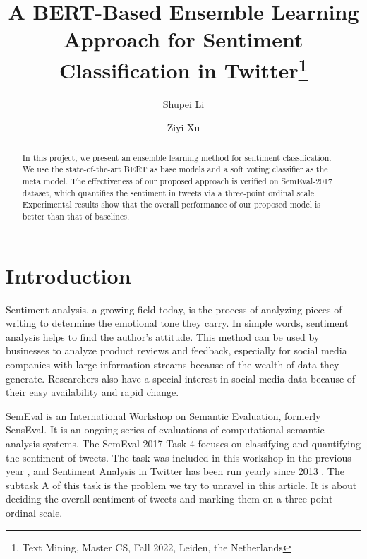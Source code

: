 \documentclass[runningheads]{llncs}
\begin{document}
%
\title{A BERT-Based Ensemble Learning Approach for Sentiment Classification in Twitter\thanks{Text Mining, Master CS, Fall 2022, Leiden, the Netherlands}}
%
%
\author{Shupei Li\and
Ziyi Xu}
%
%
%
\maketitle              %
%
\begin{abstract}
In this project, we present an ensemble learning method for sentiment classification. We use the state-of-the-art BERT as base models and a soft voting classifier as the meta model. The effectiveness of our proposed approach is verified on SemEval-2017 dataset, which quantifies the sentiment in tweets via a three-point ordinal scale. Experimental results show that the overall performance of our proposed model is better than that of baselines.

\end{abstract}
%
%
%
\section{Introduction}
Sentiment analysis, a growing field today, is the process of analyzing pieces of writing to determine the emotional tone they carry. In simple words, sentiment analysis helps to find the author's attitude. This method can be used by businesses to analyze product reviews and feedback, especially for social media companies with large information streams because of the wealth of data they generate. Researchers also have a special interest in social media data because of their easy availability and rapid change.

SemEval is an International Workshop on Semantic Evaluation, formerly SensEval. It is an ongoing series of evaluations of computational semantic analysis systems. The SemEval-2017 Task 4 focuses on classifying and quantifying the sentiment of tweets. The task was included in this workshop in the previous year \cite{nakov-etal-2016-semeval}, and Sentiment Analysis in Twitter has been run yearly since 2013 \cite{nakov-etal-2013-semeval}. The subtask A of this task is the problem we try to unravel in this article. It is about deciding the overall sentiment of tweets and marking them on a three-point ordinal scale.%
\end{document}

